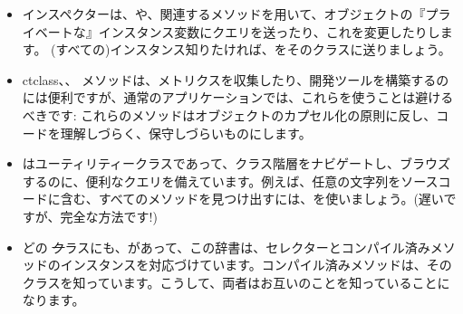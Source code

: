 \documentclass[a4paper,10pt,twoside]{book}
\begin{document}
\begin{itemize}
\item インスペクターは、や、関連するメソッドを用いて、オブジェクトの『プライベートな』インスタンス変数にクエリを送ったり、これを変更したりします。
(すべての)インスタンス知りたければ、をそのクラスに送りましょう。
\item ct{class}、、 \etc メソッドは、メトリクスを収集したり、開発ツールを構築するのには便利ですが、通常のアプリケーションでは、これらを使うことは避けるべきです: これらのメソッドはオブジェクトのカプセル化の原則に反し、コードを理解しづらく、保守しづらいものにします。
\item {} はユーティリティークラスであって、クラス階層をナビゲートし、ブラウズするのに、便利なクエリを備えています。例えば、任意の文字列をソースコードに含む、すべてのメソッドを見つけ出すには、を使いましょう。(遅いですが、完全な方法です!)
\item どの \st クラスにも、があって、この辞書は、セレクターとコンパイル済みメソッドのインスタンスを対応づけています。コンパイル済みメソッドは、そのクラスを知っています。こうして、両者はお互いのことを知っていることになります。

\end{itemize}
\end{document}
